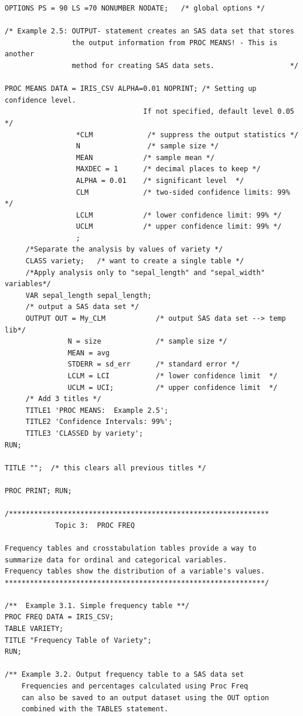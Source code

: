 \documentclass[
]{book}
\begin{document}
\begin{verbatim}
OPTIONS PS = 90 LS =70 NONUMBER NODATE;   /* global options */

/* Example 2.5: OUTPUT- statement creates an SAS data set that stores
                the output information from PROC MEANS! - This is another
                method for creating SAS data sets.                  */

PROC MEANS DATA = IRIS_CSV ALPHA=0.01 NOPRINT; /* Setting up confidence level.
                                 If not specified, default level 0.05  */
                 *CLM             /* suppress the output statistics */
                 N                /* sample size */
                 MEAN            /* sample mean */
                 MAXDEC = 1      /* decimal places to keep */
                 ALPHA = 0.01    /* significant level  */
                 CLM             /* two-sided confidence limits: 99%  */
                 LCLM            /* lower confidence limit: 99% */
                 UCLM            /* upper confidence limit: 99% */
                 ; 
     /*Separate the analysis by values of variety */
     CLASS variety;   /* want to create a single table */
     /*Apply analysis only to "sepal_length" and "sepal_width" variables*/
     VAR sepal_length sepal_length; 
     /* output a SAS data set */ 
     OUTPUT OUT = My_CLM            /* output SAS data set --> temp lib*/
               N = size             /* sample size */
               MEAN = avg         
               STDERR = sd_err      /* standard error */
               LCLM = LCI           /* lower confidence limit  */
               UCLM = UCI;          /* upper confidence limit  */
     /* Add 3 titles */
     TITLE1 'PROC MEANS:  Example 2.5';
     TITLE2 'Confidence Intervals: 99%';
     TITLE3 'CLASSED by variety';
RUN;        

TITLE "";  /* this clears all previous titles */

PROC PRINT; RUN;

/**************************************************************
            Topic 3:  PROC FREQ

Frequency tables and crosstabulation tables provide a way to
summarize data for ordinal and categorical variables. 
Frequency tables show the distribution of a variable's values.
**************************************************************/

/**  Example 3.1. Simple frequency table **/
PROC FREQ DATA = IRIS_CSV;
TABLE VARIETY;
TITLE "Frequency Table of Variety";
RUN;

/** Example 3.2. Output frequency table to a SAS data set 
    Frequencies and percentages calculated using Proc Freq 
    can also be saved to an output dataset using the OUT option 
    combined with the TABLES statement.
   

\end{verbatim}
\end{document}
